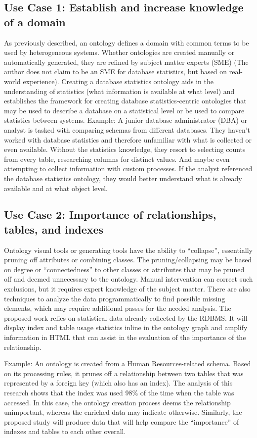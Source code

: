 \documentclass[sigconf]{acmart}
\begin{document}
\subsection{Use Case 1: Establish and increase knowledge of a domain}
As previously described, an ontology defines a domain with common terms to be used by heterogeneous systems. Whether ontologies are created manually or automatically generated, they are refined by subject matter experts (SME) (The author does not claim to be an SME for database statistics, but based on real-world experience). Creating a database statistics ontology aids in the understanding of statistics (what information is available at what level) and establishes the framework for creating database statistics-centric ontologies that may be used to describe a database on a statistical level or be used to compare statistics between systems.
Example: A junior database administrator (DBA) or analyst is tasked with comparing schemas from different databases. They haven’t worked with database statistics and therefore unfamiliar with what is collected or even available. Without the statistics knowledge, they resort to selecting counts from every table, researching columns for distinct values. And maybe even attempting to collect information with custom processes. If the analyst referenced the database statistics ontology, they would better understand what is already available and at what object level.

\subsection{Use Case 2: Importance of relationships, tables, and indexes}
Ontology visual tools or generating tools have the ability to “collapse”, essentially pruning off attributes or combining classes. The pruning/collapsing may be based on degree or “connectedness” to other classes or attributes that may be pruned off and deemed unnecessary to the ontology. Manual intervention can correct such exclusions, but it requires expert knowledge of the subject matter. There are also techniques to analyze the data programmatically to find possible missing elements, which may require additional passes for the needed analysis. The proposed work relies on statistical data already collected by the RDBMS. It will display index and table usage statistics inline in the ontology graph and amplify information in HTML that can assist in the evaluation of the importance of the relationship.

Example: An ontology is created from a Human Resources-related schema. Based on its processing rules, it prunes off a relationship between two tables that was represented by a foreign key (which also has an index). The analysis of this research shows that the index was used 98\% of the time when the table was accessed. In this case, the ontology creation process deems the relationship unimportant, whereas the enriched data may indicate otherwise. Similarly, the proposed study will produce data that will help compare the “importance” of indexes and tables to each other overall.
\end{document}
